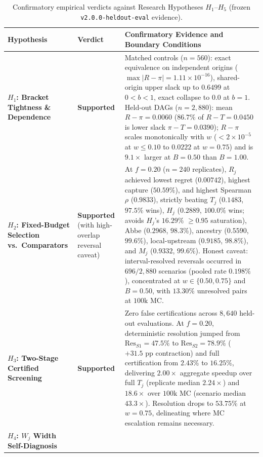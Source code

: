\begin{table}[htbp]
\centering
\caption{Confirmatory empirical verdicts against Research Hypotheses $H_1$--$H_5$ (frozen \texttt{v2.0.0-heldout-eval} evidence).}
\label{tab:v2-hypothesis-verdict}
\footnotesize
\renewcommand{\arraystretch}{1.14}
\begin{tabularx}{\textwidth}{@{}>{\raggedright\arraybackslash}p{2.35cm} >{\raggedright\arraybackslash}p{2.05cm} L@{}}
\toprule
Hypothesis & Verdict & Confirmatory Evidence and Boundary Conditions \\
\midrule
\textbf{$H_1$: Bracket Tightness \& Dependence} &
\textbf{Supported} &
Matched controls ($n=560$): exact equivalence on independent origins ($\max|R-\pi|=1.11\times 10^{-16}$), shared-origin upper slack up to $0.6499$ at $0<b<1$, exact collapse to $0.0$ at $b=1$. Held-out DAGs ($n=2,880$): mean $R-\pi = 0.0060$ ($86.7\%$ of $R-T=0.0450$ is lower slack $\pi-T=0.0390$); $R-\pi$ scales monotonically with $w$ ($<2\times 10^{-5}$ at $w\le 0.10$ to $0.0222$ at $w=0.75$) and is $9.1\times$ larger at $B=0.50$ than $B=1.00$. \\
\addlinespace
\textbf{$H_2$: Fixed-Budget Selection vs.\ Comparators} &
\textbf{Supported} (with high-overlap reversal caveat) &
At $f=0.20$ ($n=240$ replicates), $R_j$ achieved lowest regret ($0.00742$), highest capture ($50.59\%$), and highest Spearman $\rho$ ($0.9833$), strictly beating $T_j$ ($0.1483$, $97.5\%$ wins), $H_j$ ($0.2889$, $100.0\%$ wins; avoids $H_j$'s $16.29\%$ $\ge 0.95$ saturation), Abbe ($0.2968$, $98.3\%$), ancestry ($0.5590$, $99.6\%$), local-upstream ($0.9185$, $98.8\%$), and $M_j$ ($0.9332$, $99.6\%$). Honest caveat: interval-resolved reversals occurred in $696/2,880$ scenarios (pooled rate $0.198\%$), concentrated at $w \in \{0.50, 0.75\}$ and $B=0.50$, with $13.30\%$ unresolved pairs at $100\text{k}$ MC. \\
\addlinespace
\textbf{$H_3$: Two-Stage Certified Screening} &
\textbf{Supported} &
Zero false certifications across $8,640$ held-out evaluations. At $f=0.20$, deterministic resolution jumped from $\mathrm{Res}_{S1}=47.5\%$ to $\mathrm{Res}_{S2}=78.9\%$ ($+31.5\text{ pp}$ contraction) and full certification from $2.43\%$ to $16.25\%$, delivering $2.00\times$ aggregate speedup over full $T_j$ (replicate median $2.24\times$) and $18.6\times$ over $100\text{k}$ MC (scenario median $43.3\times$). Resolution drops to $53.75\%$ at $w=0.75$, delineating where MC escalation remains necessary. \\
\addlinespace
\textbf{$H_4$: $W_j$ Width Self-Diagnosis} &

\end{tabularx}
\end{table}
